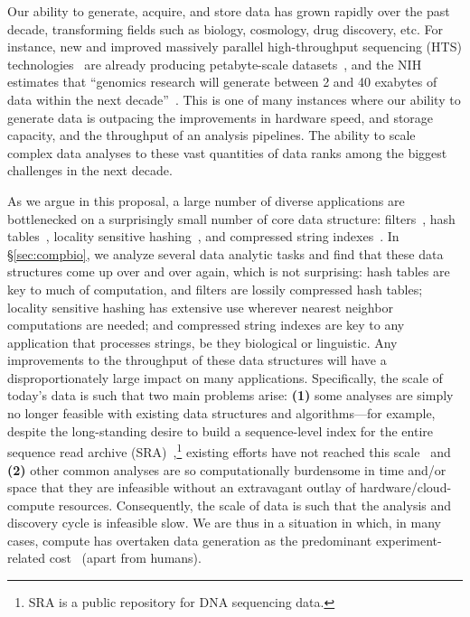 Our ability to generate, acquire, and store data has grown rapidly over
the past decade, transforming fields such as biology, cosmology, drug
discovery, etc.   
For
instance, new and improved
massively parallel high-throughput sequencing (HTS) technologies~\cite{reuter2015high} are already producing petabyte-scale
datasets~\cite{kodama2012sequence}, and the NIH estimates that ``genomics
research will generate between 2 and 40 exabytes of data within the next
decade''~\cite{NHGRIDataScience}.
This is one of many instances where our
ability to generate data is outpacing the improvements in hardware speed, and
storage capacity, and the throughput of an analysis pipelines.
The ability to scale complex data analyses to these vast quantities of data ranks among the biggest challenges in the next decade.

As we argue in this proposal, a large number of diverse applications are bottlenecked on a surprisingly small number of core data structure: filters~\cite{PandeyAlBe18, solomon2016fast},
hash tables~\cite{solomon2016fast,almodaresi2022incrementally}, locality
sensitive hashing~\cite{Marais2019}, and compressed string
indexes~\cite{Almodaresi2018Pufferfish}. 
In \S\ref{sec:compbio}, we analyze several data analytic tasks and find that these data structures come up over and over again, which is not surprising: hash tables are key to much of computation, and filters are lossily compressed hash tables; locality sensitive hashing has extensive use wherever nearest neighbor computations are needed; and compressed string indexes are key to any application that  processes strings, be they biological or linguistic.
Any improvements to the throughput of these data structures will have a disproportionately large impact on many applications. 
Specifically, the scale of today's data is
such that two main problems arise: \textbf{(1)} some analyses are simply
no longer feasible with existing data structures and algorithms---for example,
despite the long-standing desire to build a sequence-level index for the entire
sequence read archive (SRA)~\cite{SRA},\footnote{SRA is a public repository for DNA sequencing data.} existing efforts have not reached this
scale~\cite{Karasikov2020, HarrisM20, SolomonK17, almodaresi2022incrementally,
AlmodaresiPFJP20,PandeyAlBe18} and \textbf{(2)} other common analyses are so computationally burdensome in time and/or space that they are infeasible without an extravagant outlay of hardware/cloud-compute resources.
Consequently, the scale of data is such that the analysis and discovery cycle is infeasible slow.  We are thus in a situation in
which, in many cases, compute has overtaken data generation as the predominant
experiment-related cost~\cite{Muir_2016} (apart from humans).


